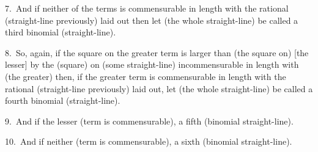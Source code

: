 \begin{Parallel}{}{}
{7.~And if neither of the terms is commensurable in length with the 
rational (straight-line previously) laid out then let (the whole straight-line) be called a third
binomial (straight-line).

8.~So, again, if the square on the greater term is larger than (the
square on) [the lesser] by the (square) on (some straight-line)
incommensurable in length with (the greater) then, if the
greater term is commensurable in length with the  rational
(straight-line previously) laid out, let (the whole straight-line) be called a fourth
binomial (straight-line).

9.~And if the lesser (term is commensurable), a fifth (binomial straight-line).

10.~And if neither (term is commensurable), a sixth (binomial straight-line).}
\end{Parallel}


